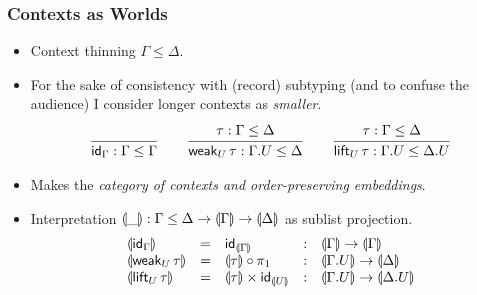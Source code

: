 \documentclass[t,fleqn,usenames,dvipsnames]{beamer}
\makeatletter
\renewcommand{\ru}[2]{\dfrac{\begin{array}[b]{@{}c@{}} #1 \end{array}}{\begin{array}[t]{@{}l@{}} #2 \end{array}}}
\newcommand{\cAnn}{\color{red!80!black}}%
\renewcommand{\emph}[1]{{\cAnn#1}}
\newcommand{\cType}{\color{orange!60!black}}
\renewcommand{\emph}[1]{\textit{\cType#1}}
\makeatother
\begin{document}
\begin{frame}%
  \frametitle{Contexts as Worlds}
  \vspace{-3ex}
  \begin{itemize}
  \item Context thinning $\Gamma \leq \Delta$.
  \item For the sake of consistency with (record) subtyping (and to confuse the
    audience) I consider longer contexts as \emph{smaller}.
\[
  \ru{
    }{\tid_\Gamma : \Gamma \leq \Gamma}
\qquad
  \ru{\tau : \Gamma \leq \Delta
    }{\weak[U] \tau : \Gamma.U \leq \Delta}
\qquad
  \ru{\tau : \Gamma \leq \Delta
    }{\lift[U] \tau : \Gamma.U \leq \Delta.U}
\]
\vspace{-2ex}
  \item Makes the \emph{category of contexts and order-preserving embeddings}.

  \item Interpretation $\denty\_ : \Gamma \leq \Delta \to
    \denty\Gamma \to \denty\Delta$ as sublist projection.
\[
\begin{array}{lllll}
  \denty{\tid_\Gamma} & = & \tid_{\denty\Gamma}
    & : & \denty\Gamma \to \denty\Gamma \\
  \denty{\weak[U] \tau} & = & \denty\tau \comp \pi_1
    & : & \denty{\Gamma.U} \to \denty\Delta \\
  \denty{\lift[U] \tau} & = & \denty\tau \times \tid_{\denty U}
    & : & \denty{\Gamma.U} \to \denty{\Delta.U} \\
\end{array}
\]
  \end{itemize}
\end{frame}
\end{document}
